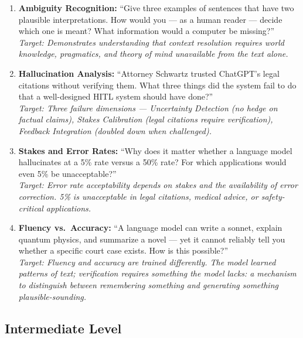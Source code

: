 \begin{enumerate}
    \item \textbf{Ambiguity Recognition:} ``Give three examples of sentences that have two plausible interpretations. How would you --- as a human reader --- decide which one is meant? What information would a computer be missing?''\\
    \textit{Target: Demonstrates understanding that context resolution requires world knowledge, pragmatics, and theory of mind unavailable from the text alone.}

    \item \textbf{Hallucination Analysis:} ``Attorney Schwartz trusted ChatGPT's legal citations without verifying them. What three things did the system fail to do that a well-designed HITL system should have done?''\\
    \textit{Target: Three failure dimensions --- Uncertainty Detection (no hedge on factual claims), Stakes Calibration (legal citations require verification), Feedback Integration (doubled down when challenged).}

    \item \textbf{Stakes and Error Rates:} ``Why does it matter whether a language model hallucinates at a 5\% rate versus a 50\% rate? For which applications would even 5\% be unacceptable?''\\
    \textit{Target: Error rate acceptability depends on stakes and the availability of error correction. 5\% is unacceptable in legal citations, medical advice, or safety-critical applications.}

    \item \textbf{Fluency vs.\ Accuracy:} ``A language model can write a sonnet, explain quantum physics, and summarize a novel --- yet it cannot reliably tell you whether a specific court case exists. How is this possible?''\\
    \textit{Target: Fluency and accuracy are trained differently. The model learned patterns of text; verification requires something the model lacks: a mechanism to distinguish between remembering something and generating something plausible-sounding.}
\end{enumerate}

\subsection{Intermediate Level}

